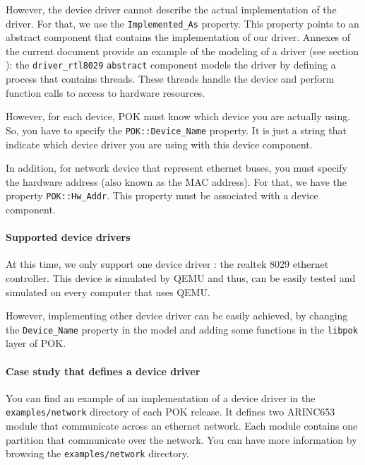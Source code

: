          However, the device driver cannot describe the actual implementation of
         the driver. For that, we use the \texttt{Implemented\_As} property.
         This property points to an abstract component that contains the
         implementation of our driver. Annexes of the current document provide
         an example of the modeling of a driver (see section
         \label{annex-network-example}): the \texttt{driver\_rtl8029}
         \texttt{abstract} component models the driver by defining a process
         that contains threads. These threads handle the device and perform
         function calls to access to hardware resources.

         However, for each device, POK must know which device you are actually
         using. So, you have to specify the \texttt{POK::Device\_Name} property.
         It is just a string that indicate which device driver you are using
         with this device component.

         In addition, for network device that represent ethernet buses, you must
         specify the hardware address (also known as the MAC address). For that,
         we have the property \texttt{POK::Hw\_Addr}. This property must be
         associated with a device component.

         \paragraph{Supported device drivers\\}
         At this time, we only support one device driver : the realtek 8029
         ethernet controller. This device is simulated by QEMU and thus, can be
         easily tested and simulated on every computer that uses QEMU.

         However, implementing other device driver can be easily achieved, by
         changing the \texttt{Device\_Name} property in the model and adding
         some functions in the \texttt{libpok} layer of POK.

         \paragraph{Case study that defines a device driver\\}
         You can find an example of an implementation of a device driver in the
         \texttt{examples/network} directory of each POK release. It defines two
         ARINC653 module that communicate across an ethernet network. Each
         module contains one partition that communicate over the network. You
         can have more information by browsing the \texttt{examples/network}
         directory.


